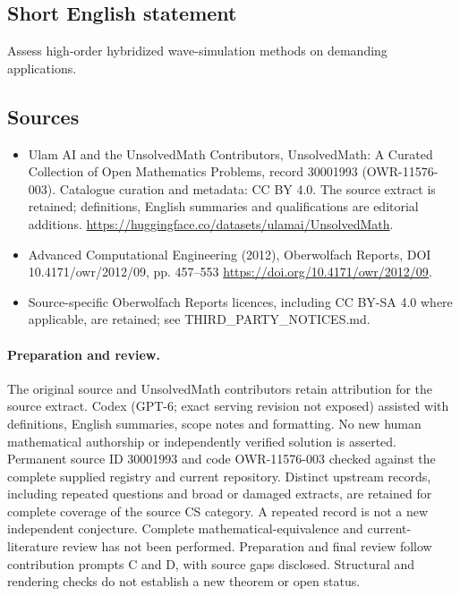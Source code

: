 \documentclass[11pt]{article}
\begin{document}
\subsection{Short English statement}
Assess high-order hybridized wave-simulation methods on demanding applications.
\subsection{Sources}
\begin{itemize}
\item[\hypertarget{source:30001993:1}{S1}] Ulam AI and the UnsolvedMath Contributors, UnsolvedMath: A Curated Collection of Open Mathematics Problems, record 30001993 (OWR-11576-003). Catalogue curation and metadata: CC BY 4.0. The source extract is retained; definitions, English summaries and qualifications are editorial additions.
\url{https://huggingface.co/datasets/ulamai/UnsolvedMath}.
\item[\hypertarget{source:30001993:2}{S2}] Advanced Computational Engineering (2012), Oberwolfach Reports, DOI 10.4171/owr/2012/09, pp. 457--553
\url{https://doi.org/10.4171/owr/2012/09}.
\item Source-specific Oberwolfach Reports licences, including CC BY-SA 4.0 where applicable, are retained; see THIRD\_PARTY\_NOTICES.md.
\end{itemize}
\paragraph{Preparation and review.}
The original source and UnsolvedMath contributors retain attribution for the source extract. Codex (GPT-6; exact serving revision not exposed) assisted with definitions, English summaries, scope notes and formatting. No new human mathematical authorship or independently verified solution is asserted. Permanent source ID 30001993 and code OWR-11576-003 checked against the complete supplied registry and current repository. Distinct upstream records, including repeated questions and broad or damaged extracts, are retained for complete coverage of the source CS category. A repeated record is not a new independent conjecture. Complete mathematical-equivalence and current-literature review has not been performed. Preparation and final review follow contribution prompts C and D, with source gaps disclosed. Structural and rendering checks do not establish a new theorem or open status.
\label{end:30001993}
\end{document}
